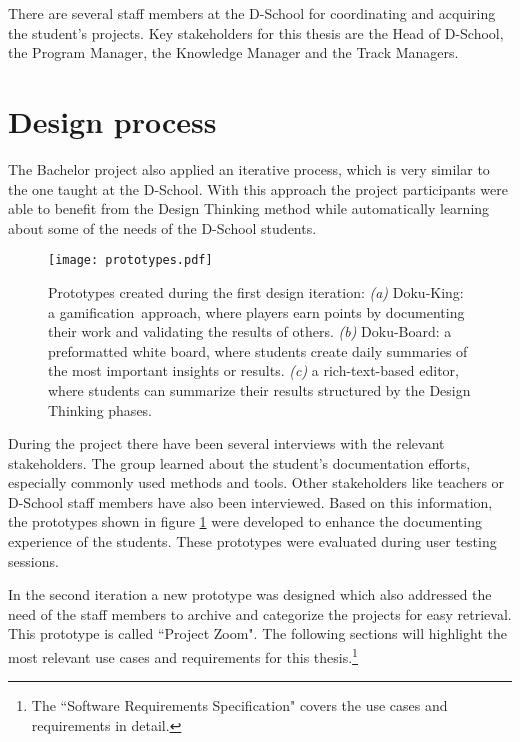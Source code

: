 There are several staff members at the D-School for coordinating and acquiring the student's pro\-jects. Key stakeholders for this thesis are the Head of D-School, the Program Manager, the Knowledge Manager and the Track Managers.

\section{Design process}
The Bachelor project also applied an iterative process, which is very similar to the one taught at the D-School. With this approach the project participants were able to benefit from the Design Thinking method while automatically learning about some of the needs of the D-School students.

\begin{figure}
\texttt{[image: prototypes.pdf]}
\caption[Prototypes created during the first design iteration]{Prototypes created during the first design iteration: \textit{(a)} Doku-King: a gamification\footnotemark ~approach, where players earn points by documenting their work and validating the results of others. \textit{(b)} Doku-Board: a preformatted white board, where students create daily summaries of the most important insights or results. \textit{(c)} a rich-text-based editor, where students can summarize their results structured by the Design Thinking phases.}
\label{fig:First_prototypes}
\end{figure}


During the project there have been several interviews with the relevant stakeholders. The group learned about the student's documentation efforts, especially commonly used methods and tools. Other stakeholders like teachers or D-School staff members have also been interviewed. Based on this information, the prototypes shown in figure \ref{fig:First_prototypes} were developed to enhance the documenting experience of the students. These prototypes were evaluated during user testing sessions.

In the second iteration a new prototype was designed which also addressed the need of the staff members to archive and categorize the projects for easy retrieval. This prototype is called ``Project Zoom". The following sections will highlight the most relevant use cases and requirements for this thesis.\footnote{The ``Software Requirements Specification"\cite{ReqSpec} covers the use cases and requirements in detail.}

